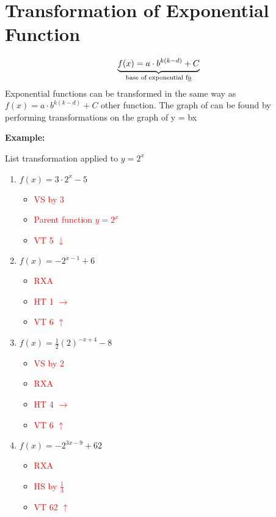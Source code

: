\documentclass[12pt,a4paper]{article}
\newenvironment{example}
  {\begin{framed}\colorbox{examplecolor}{
  \parbox{\dimexpr\linewidth-2\fboxsep}{
  \textbf{Example:}}}}
  {\end{framed}}
\begin{document}
\section*{Transformation of Exponential Function}
\begin{equation*}
    \underbrace{f(x)=a \cdot b ^{k(k-d)}+C}_{\text{base of exponential f\underline{n}}}
\end{equation*}
Exponential functions can be transformed in the same way as $f(x)=a \cdot b ^{k(k-d)}+C$
other function. The graph of can be found by
performing transformations on the graph of y = bx
\begin{example}
    List transformation applied to \(y=2^x\)
    \begin{enumerate}
        \item \(f(x)=3 \cdot 2^x-5\)
        \begin{itemize}
            \item \textcolor{red}{VS by 3}
            \item \textcolor{red}{Parent function \(y=2^x\)}
            \item \textcolor{red}{VT 5 \(\downarrow\)}
        \end{itemize}
        \item \(f(x)=-2^{x-1}+6\)
        \begin{itemize}
            \item \textcolor{red}{RXA}
            \item \textcolor{red}{HT 1 \(\to\)}
            \item \textcolor{red}{VT 6 \(\uparrow\)}
        \end{itemize}
        \item \(f(x)=\frac{1}{2}(2)^{-x+4} -8\)
        \begin{itemize}
            \item \textcolor{red}{VS by 2}
            \item \textcolor{red}{RXA}
            \item \textcolor{red}{HT 4 \(\to\)}
            \item \textcolor{red}{VT 6 \(\uparrow\)}
        \end{itemize}
        \item \(f(x)=-2^{3x-9}+62\)
        \begin{itemize}
            \item \textcolor{red}{RXA}
            \item \textcolor{red}{HS by \(\frac{1}{3}\)}
            \item \textcolor{red}{VT 62 \(\uparrow\)}
        \end{itemize} 
    \end{enumerate}
\end{example}
\end{document}
